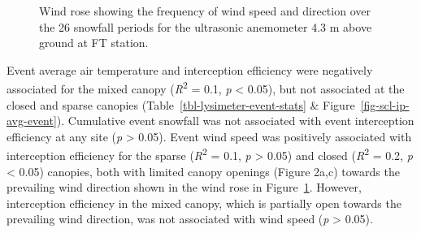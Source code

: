 \documentclass[
  letterpaper,
  DIV=11,
  numbers=noendperiod]{scrartcl}
\begin{document}

\begin{figure}[H]


\caption{\label{fig-wind-rose}Wind rose showing the frequency of wind
speed and direction over the 26 snowfall periods for the ultrasonic
anemometer 4.3 m above ground at FT station.}

\end{figure}%

Event average air temperature and interception efficiency were
negatively associated for the mixed canopy (\emph{R}\textsuperscript{2}
= 0.1, \emph{p} \textless{} 0.05), but not associated at the closed and
sparse canopies (Table~\ref{tbl-lysimeter-event-stats} \&
Figure~\ref{fig-scl-ip-avg-event}). Cumulative event snowfall was not
associated with event interception efficiency at any site (\emph{p}
\textgreater{} 0.05). Event wind speed was positively associated with
interception efficiency for the sparse (\emph{R}\textsuperscript{2} =
0.1, \emph{p} \textgreater{} 0.05) and closed
(\emph{R}\textsuperscript{2} = 0.2, \emph{p} \textless{} 0.05) canopies,
both with limited canopy openings (Figure 2a,c) towards the prevailing
wind direction shown in the wind rose in Figure~\ref{fig-wind-rose}.
However, interception efficiency in the mixed canopy, which is partially
open towards the prevailing wind direction, was not associated with wind
speed (\emph{p} \textgreater{} 0.05).
\end{document}

